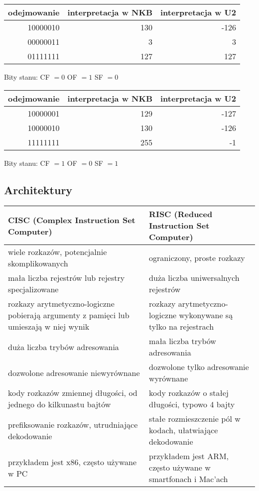 \begin{example}
    \begin{tabular}{r r r}
        \hline
        odejmowanie & interpretacja w NKB & interpretacja w U2 \\
        \hline
        10000010 & 130 & -126 \\
        00000011 & 3 & 3\\
        \hline
        01111111 & 127 & 127 \\ 
        \hline
    \end{tabular}

    Bity stanu: \;
    {\ttfamily CF} $ = 0$ \; 
    {\ttfamily OF} $ = 1$ \; 
    {\ttfamily SF} $ = 0$ \; 

    \vspace{8pt}
    \begin{tabular}{r r r}
        \hline
        odejmowanie & interpretacja w NKB & interpretacja w U2 \\
        \hline
        10000001 & 129 & -127 \\
        10000010 & 130 & -126 \\
        \hline
        11111111 & 255 & -1 \\ 
        \hline
    \end{tabular}

    Bity stanu: \;
    {\ttfamily CF} $ = 1$ \; 
    {\ttfamily OF} $ = 0$ \; 
    {\ttfamily SF} $ = 1$ \; 
\end{example}

\subsection{Architektury}

\begin{tabular}{|p{8cm}|p{8cm}|}
    \hline
    \textbf{CISC} (Complex Instruction Set Computer) & 
    \textbf{RISC} (Reduced Instruction Set Computer) \\
    \hline
    wiele rozkazów, potencjalnie skomplikowanych & ograniczony, proste rozkazy \\
    \hline
    mała liczba rejestrów lub rejestry specjalizowane & duża liczba uniwersalnych rejestrów \\
    \hline
    rozkazy arytmetyczno-logiczne pobierają argumenty z pamięci lub umieszają w niej wynik & rozkazy arytmetyczno-logiczne wykonywane są tylko na rejestrach \\
    \hline
    duża liczba trybów adresowania & mała liczba trybów adresowania \\
    \hline
    dozwolone adresowanie niewyrównane & dozwolone tylko adresowanie wyrównane \\
    \hline
    kody rozkazów zmiennej długości, od jednego do kilkunastu bajtów &
    kody rozkazów o stałej długości, typowo 4 bajty \\
    \hline
    prefiksowanie rozkazów, utrudniające dekodowanie &
    stałe rozmieszczenie pól w kodach, ułatwiające dekodowanie \\
    \hline
    przykładem jest x86, często używane w PC
    & przykładem jest ARM, często używane w smartfonach i Mac'ach \\
    \hline
\end{tabular}

